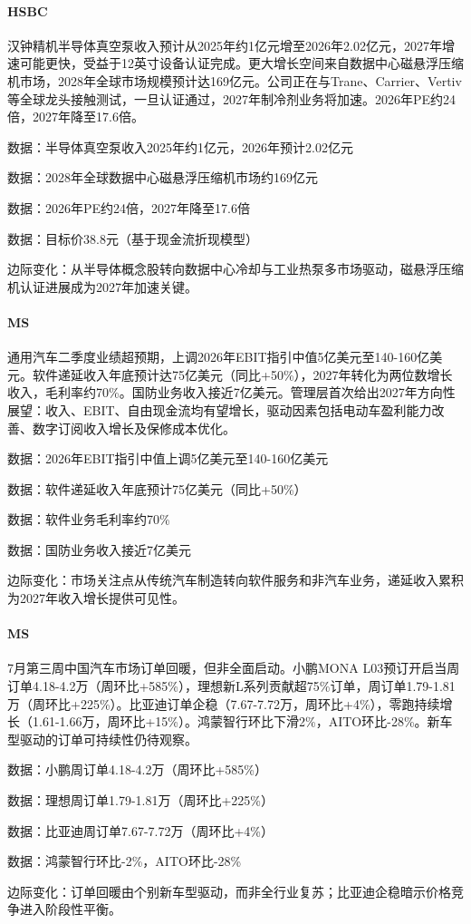 \documentclass[11pt]{ctexart}
\begin{document}
\paragraph{HSBC} 汉钟精机半导体真空泵收入预计从2025年约1亿元增至2026年2.02亿元，2027年增速可能更快，受益于12英寸设备认证完成。更大增长空间来自数据中心磁悬浮压缩机市场，2028年全球市场规模预计达169亿元。公司正在与Trane、Carrier、Vertiv等全球龙头接触测试，一旦认证通过，2027年制冷剂业务将加速。2026年PE约24倍，2027年降至17.6倍。
{\small\color{refgray}数据：半导体真空泵收入2025年约1亿元，2026年预计2.02亿元\par}
{\small\color{refgray}数据：2028年全球数据中心磁悬浮压缩机市场约169亿元\par}
{\small\color{refgray}数据：2026年PE约24倍，2027年降至17.6倍\par}
{\small\color{refgray}数据：目标价38.8元（基于现金流折现模型）\par}
{\small\color{refgray}边际变化：从半导体概念股转向数据中心冷却与工业热泵多市场驱动，磁悬浮压缩机认证进展成为2027年加速关键。\par}
\paragraph{MS} 通用汽车二季度业绩超预期，上调2026年EBIT指引中值5亿美元至140-160亿美元。软件递延收入年底预计达75亿美元（同比+50\%），2027年转化为两位数增长收入，毛利率约70\%。国防业务收入接近7亿美元。管理层首次给出2027年方向性展望：收入、EBIT、自由现金流均有望增长，驱动因素包括电动车盈利能力改善、数字订阅收入增长及保修成本优化。
{\small\color{refgray}数据：2026年EBIT指引中值上调5亿美元至140-160亿美元\par}
{\small\color{refgray}数据：软件递延收入年底预计75亿美元（同比+50\%）\par}
{\small\color{refgray}数据：软件业务毛利率约70\%\par}
{\small\color{refgray}数据：国防业务收入接近7亿美元\par}
{\small\color{refgray}边际变化：市场关注点从传统汽车制造转向软件服务和非汽车业务，递延收入累积为2027年收入增长提供可见性。\par}
\paragraph{MS} 7月第三周中国汽车市场订单回暖，但非全面启动。小鹏MONA L03预订开启当周订单4.18-4.2万（周环比+585\%），理想新L系列贡献超75\%订单，周订单1.79-1.81万（周环比+225\%）。比亚迪订单企稳（7.67-7.72万，周环比+4\%），零跑持续增长（1.61-1.66万，周环比+15\%）。鸿蒙智行环比下滑2\%，AITO环比-28\%。新车型驱动的订单可持续性仍待观察。
{\small\color{refgray}数据：小鹏周订单4.18-4.2万（周环比+585\%）\par}
{\small\color{refgray}数据：理想周订单1.79-1.81万（周环比+225\%）\par}
{\small\color{refgray}数据：比亚迪周订单7.67-7.72万（周环比+4\%）\par}
{\small\color{refgray}数据：鸿蒙智行环比-2\%，AITO环比-28\%\par}
{\small\color{refgray}边际变化：订单回暖由个别新车型驱动，而非全行业复苏；比亚迪企稳暗示价格竞争进入阶段性平衡。\par}
\end{document}
